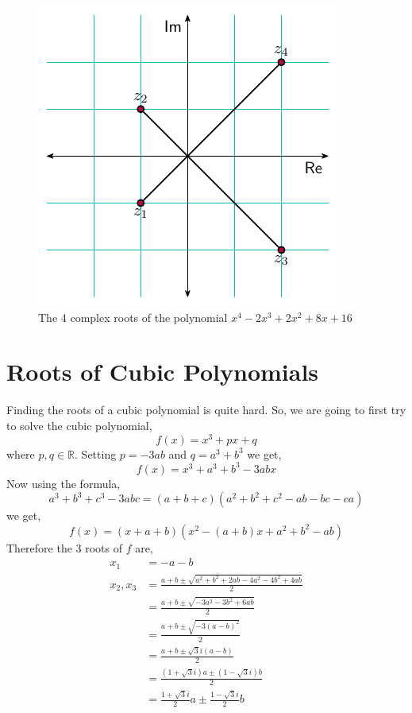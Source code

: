 \begin{figure}[H]
\centering
\includegraphics[scale=1]{polynomials/figures/cplane_roots.pdf}
\caption{The 4 complex roots of the polynomial $x^{4} - 2 x^{3} + 2 x^{2} + 8 x + 16$ }
\label{fig:cplane_roots}
\end{figure}

\section{Roots of Cubic Polynomials}

Finding the roots of a cubic polynomial is quite hard. So, we are going to first try to solve the cubic polynomial,
\[
    f(x) = x^{3} + px + q
\]
where $p, q \in \mathbb{R}$.
Setting $p=-3ab$ and $q = a^{3} + b^{3}$ we get,
\[
    f(x) = x^{3} + a^{3} + b^{3} - 3abx
\]
Now using the formula,
\[
    a^{3} + b^{3} + c^{3} - 3abc = (a+b+c)(a^{2} + b^{2} + c^{2} - ab - bc - ca)
\]
we get,
\[
    f(x) = (x+a+b)(x^{2} -(a+b)x + a^{2} + b^{2} - ab)
\]
Therefore the 3 roots of $f$ are,
\begin{align*}
    x_{1}        &= -a-b \\
    x_{2}, x_{3} &= \frac{a+b \pm \sqrt{a^{2} + b^{2} + 2ab - 4a^{2} - 4b^{2} + 4ab}}{2}\\
                 &= \frac{a+b \pm \sqrt{-3a^{2} -3b^{2} + 6ab}}{2} \\
                 &= \frac{a+b \pm \sqrt{-3(a-b)^{2}}}{2} \\
                 &= \frac{a+b \pm \sqrt{3}i(a-b)}{2} \\
                 &= \frac{(1 + \sqrt{3}i)a \pm (1 - \sqrt{3}i)b}{2} \\
                 &= \frac{1+\sqrt{3}i}{2}a \pm \frac{1-\sqrt{3}i}{2}b
\end{align*}

